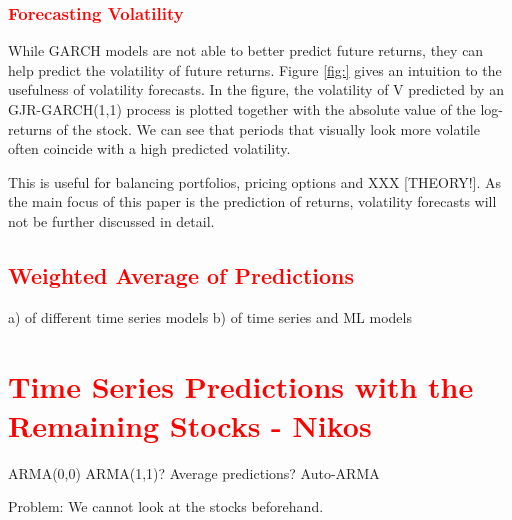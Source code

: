 \subsubsection{\textcolor{red}{Forecasting Volatility}}
While GARCH models are not able to better predict future returns, they can help predict the volatility of future returns. Figure \ref{fig:} gives an intuition to the usefulness of volatility forecasts. In the figure, the volatility of V predicted by an GJR-GARCH(1,1) process is plotted together with the absolute value of the log-returns of the stock. We can see that periods that visually look more volatile often coincide with a high predicted volatility. 

This is useful for balancing portfolios, pricing options and XXX [THEORY!]. As the main focus of this paper is the prediction of returns, volatility forecasts will not be further discussed in detail. 


\subsection{\textcolor{red}{Weighted Average of Predictions}}
a) of different time series models
b) of time series and ML models



\section{\textcolor{red}{Time Series Predictions with the Remaining Stocks - Nikos}}

ARMA(0,0)
ARMA(1,1)? 
Average predictions?
Auto-ARMA


Problem: We cannot look at the stocks beforehand. 







